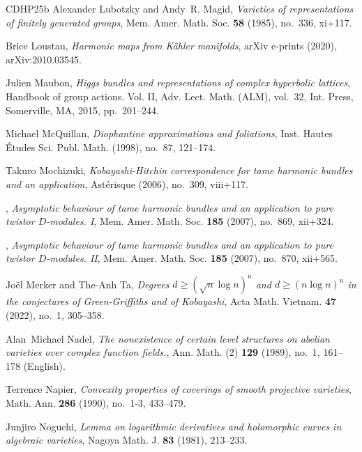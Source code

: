 \documentclass[english]{amsproc}
\theoremstyle{plain}
\theoremstyle{definition}
\theoremstyle{remark}
\theoremstyle{plain}
\numberwithin{equation}{thm} %
\begin{document}
\begin{thebibliography}{CDHP25b}
		Alexander Lubotzky and Andy~R. Magid, \emph{Varieties of representations of
			finitely generated groups}, Mem. Amer. Math. Soc. \textbf{58} (1985),
		no.~336, xi+117. 
		
		Brice {Loustau}, \emph{{Harmonic maps from K{\"a}hler manifolds}}, arXiv
		e-prints (2020), arXiv:2010.03545.
		
		Julien Maubon, \emph{Higgs bundles and representations of complex hyperbolic
			lattices}, Handbook of group actions. {V}ol. {II}, Adv. Lect. Math. (ALM),
		vol.~32, Int. Press, Somerville, MA, 2015, pp.~201--244. 
		
		Michael McQuillan, \emph{Diophantine approximations and foliations}, Inst.
		Hautes \'Etudes Sci. Publ. Math. (1998), no.~87, 121--174. 
		
		Takuro Mochizuki, \emph{Kobayashi-{H}itchin correspondence for tame harmonic
			bundles and an application}, Ast\'{e}risque (2006), no.~309, viii+117.
		
		\bysame, \emph{Asymptotic behaviour of tame harmonic bundles and an application
			to pure twistor {$D$}-modules. {I}}, Mem. Amer. Math. Soc. \textbf{185}
		(2007), no.~869, xii+324. 
		
		\bysame, \emph{Asymptotic behaviour of tame harmonic bundles and an application
			to pure twistor {$D$}-modules. {II}}, Mem. Amer. Math. Soc. \textbf{185}
		(2007), no.~870, xii+565. 
		
		Jo\"el Merker and The-Anh Ta, \emph{Degrees {$d \geqslant(\sqrt{n} \log n)^n$}
			and {$d\geqslant (n\log n)^n$} in the conjectures of {G}reen-{G}riffiths and
			of {K}obayashi}, Acta Math. Vietnam. \textbf{47} (2022), no.~1, 305--358.
		
		Alan~Michael {Nadel}, \emph{{The nonexistence of certain level structures on
				abelian varieties over complex function fields.}}, {Ann. Math. (2)}
		\textbf{129} (1989), no.~1, 161--178 (English).
		
		Terrence Napier, \emph{Convexity properties of coverings of smooth projective
			varieties}, Math. Ann. \textbf{286} (1990), no.~1-3, 433--479. 
		
		Junjiro Noguchi, \emph{Lemma on logarithmic derivatives and holomorphic curves
			in algebraic varieties}, Nagoya Math. J. \textbf{83} (1981), 213--233.
		

\end{thebibliography}
\end{document}
